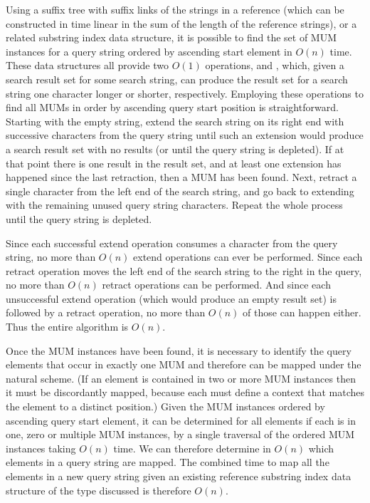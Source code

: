 Using a suffix tree with suffix links of the strings in a reference (which can be constructed in time linear in the sum of the length of the reference strings), or a related substring index data structure, it is possible to find the set of MUM instances for a query string ordered by ascending start element in $O(n)$ time. These data structures all provide two $O(1)$ operations,  and , which, given a search result set for some search string, can produce the result set for a search string one character longer or shorter, respectively. Employing these operations to find all MUMs in order by ascending query start position is straightforward. Starting with the empty string, extend the search string on its right end with successive characters from the query string until such an extension would produce a search result set with no results (or until the query string is depleted). If at that point there is one result in the result set, and at least one extension has happened since the last retraction, then a MUM has been found. Next, retract a single character from the left end of the search string, and go back to extending with the remaining unused query string characters. Repeat the whole process until the query string is depleted.



Since each successful extend operation consumes a character from the query string, no more than $O(n)$ extend operations can ever be performed. Since each retract operation moves the left end of the search string to the right in the query, no more than $O(n)$ retract operations can be performed. And since each unsuccessful extend operation (which would produce an empty result set) is followed by a retract operation, no more than $O(n)$ of those can happen either. Thus the entire algorithm is $O(n)$. 

Once the MUM instances have been found, it is necessary to identify the query elements that occur in exactly one MUM and therefore can be mapped under the natural scheme. (If an element is contained in two or more MUM instances then it must be discordantly mapped, because each must define a context that matches the element to a distinct position.) Given the MUM instances ordered by ascending query start element, it can be determined for all elements if each is in one, zero or multiple MUM instances, by a single traversal of the ordered MUM instances taking $O(n)$ time. We can therefore determine in $O(n)$ which elements in a query string are mapped. The combined time to map all the elements in a new query string given an existing reference substring index data structure of the type discussed is therefore $O(n)$.

